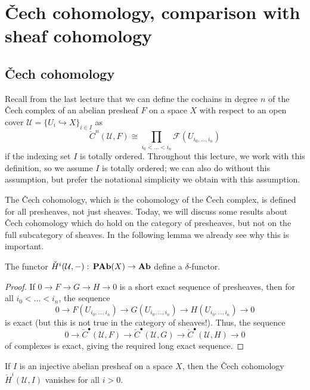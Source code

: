 \chapter{Čech cohomology, comparison with sheaf cohomology}

\section{Čech cohomology}
\noindent
Recall from the last lecture that we can define the cochains in degree \(n\) of the Čech complex of an abelian presheaf \(F\) on a space \(X\) with respect to an open cover \(\mathcal U=\{U_i\hookrightarrow X\}_{i\in I}\) as
\[ \check{C}^n(\mathcal U,F) \cong \prod_{i_0<\ldots<i_n}\mathcal F(U_{i_0,\ldots,i_n}) \]
if the indexing set \(I\) is totally ordered.
Throughout this lecture, we work with this definition, so we assume \(I\) is totally ordered; we can also do without this assumption, but prefer the notational simplicity we obtain with this assumption.

The Čech cohomology, which is the cohomology of the Čech complex, is defined for all presheaves, not just sheaves.
Today, we will discuss some results about Čech cohomology which do hold on the category of presheaves, but not on the full subcategory of sheaves.
In the following lemma we already see why this is important.

\begin{lem}
The functor \(\check{H}^i(\mathcal U,-)\colon\catAbelianPresheaf(X)\to\catAbelianGroup\) define a \(\delta\)-functor.
\end{lem}
\begin{proof}
If \(0\to F\to G\to H\to 0\) is a short exact sequence of presheaves, then for all \(i_0<\ldots<i_n\), the sequence
\[ 0 \to F(U_{i_0,\ldots,i_n}) \to G(U_{i_0,\ldots,i_n}) \to H(U_{i_0,\ldots,i_n}) \to 0 \]
is exact (but this is not true in the category of sheaves!).
Thus, the sequence
\[ 0 \to \check{C}^\bullet(\mathcal U,F) \to \check{C}^\bullet(\mathcal U,G) \to \check{C}^\bullet(\mathcal U,H)\to 0 \]
of complexes is exact, giving the required long exact sequence.
\end{proof}

\begin{thm}\label{thm:Čech-chomology-vanishes-injective-presheaf}
If \(I\) is an injective abelian presheaf on a space \(X\), then the Čech cohomology \(\check{H}^i(\mathcal U,I)\) vanishes for all \(i>0\).
\end{thm}

